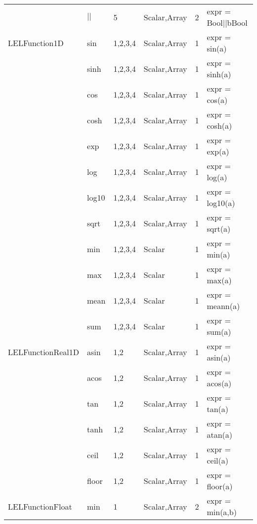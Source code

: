 \begin{center}
\begin{tabular}{|l|l|l|l|l|l}
                 &     $||$       &   5          &   Scalar,Array   &   2   &   expr = Bool$||$bBool \\
LELFunction1D &        sin      &   1,2,3,4    &   Scalar,Array   &   1   &   expr = sin(a) \\
               &       sinh     &   1,2,3,4    &   Scalar,Array   &   1   &   expr = sinh(a) \\
                &      cos      &   1,2,3,4    &   Scalar,Array   &   1   &   expr = cos(a) \\
                 &     cosh     &   1,2,3,4    &   Scalar,Array   &   1   &   expr = cosh(a) \\
                  &    exp      &   1,2,3,4    &   Scalar,Array   &   1   &   expr = exp(a) \\
              &        log      &   1,2,3,4    &   Scalar,Array   &   1   &   expr = log(a) \\
               &       log10    &   1,2,3,4    &   Scalar,Array   &   1   &   expr = log10(a) \\
                &      sqrt     &   1,2,3,4    &   Scalar,Array   &   1   &   expr = sqrt(a) \\
                 &     min      &   1,2,3,4    &   Scalar         &   1   &   expr = min(a) \\
              &        max      &   1,2,3,4    &   Scalar         &   1   &   expr = max(a) \\
               &       mean     &   1,2,3,4    &   Scalar         &   1   &   expr = meann(a) \\
                &      sum      &   1,2,3,4    &   Scalar         &   1   &   expr = sum(a) \\
LELFunctionReal1D &    asin     &   1,2        &   Scalar,Array   &   1   &   expr = asin(a) \\
                  &    acos     &   1,2        &   Scalar,Array   &   1   &   expr = acos(a) \\
                  &    tan      &   1,2        &   Scalar,Array   &   1   &   expr = tan(a) \\
                  &    tanh     &   1,2        &   Scalar,Array   &   1   &   expr = atan(a) \\
                  &    ceil     &   1,2        &   Scalar,Array   &   1   &   expr = ceil(a) \\
                  &    floor    &   1,2        &   Scalar,Array   &   1   &   expr = floor(a) \\
LELFunctionFloat  &    min      &   1          &   Scalar,Array   &   2   &   expr = min(a,b) \\

\end{tabular}
\end{center}
